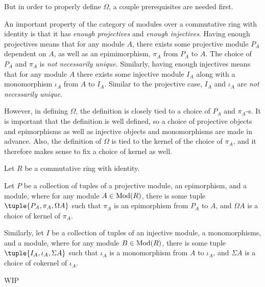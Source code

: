 But in order to properly define \( \Omega \), a couple prerequisites are needed first.

An important property of the category of modules over a commutative ring with identity is that it has \emph{enough projectives} and \emph{enough injectives}. Having enough projectives means that for any module \( A \), there exists some projective module \( P_A \) dependent on \( A \), as well as an epimimorphism, \( \pi_A \) from \( P_A \) to \( A \). The choice of \( P_A \) and \( \pi_A \) is \emph{not necessarily unique}. Similarly, having enough injectives means that for any module \( A \) there exists some injective module \( I_A \) along with a monomorphism \( \iota_A \) from \( A \) to \( I_A \). Similar to the projective case, \( I_A \) and \( \iota_A \) are \emph{not necessarily unique}.

However, in defining \( \Omega \), the definition is closely tied to a choice of \( P_A \) and \( \pi_A \)-s. It is important that the definition is well defined, so a choice of projective objects and epimorphisms as well as injective objects and monomorphisms are made in advance. Also, the definition of \( \Omega \) is tied to the kernel of the choice of \( \pi_A \), and it therefore makes sense to fix a choice of kernel as well.

\begin{definition}
    \label{def:stmod_P_and_I}
    Let \( R \) be a commutative ring with identity.

    Let \( P \) be a collection of tuples of a projective module, an epimorphism, and a module, where for any module \( A \in \operatorname{Mod}(R) \), there is some tuple \( \tuple{P_A, \pi_A, \Omega A} \) such that \( \pi_A \) is an epimorphism from \( P_A \) to \( A \), and \( \Omega A \) is a choice of kernel of \( \pi_A \).

    Similarly, let \( I \) be a collection of tuples of an injective module, a monomorphisms, and a module, where for any module \( B \in \operatorname{Mod}(R) \), there is some tuple \( \tuple{I_A, \iota_A, \Sigma A} \) such that \( \iota_A \) is a monomorphism from \( A \) to \( \iota_A \), and \( \Sigma A \) is a choice of cokernel of \( \iota_A \).
\end{definition}

WIP

